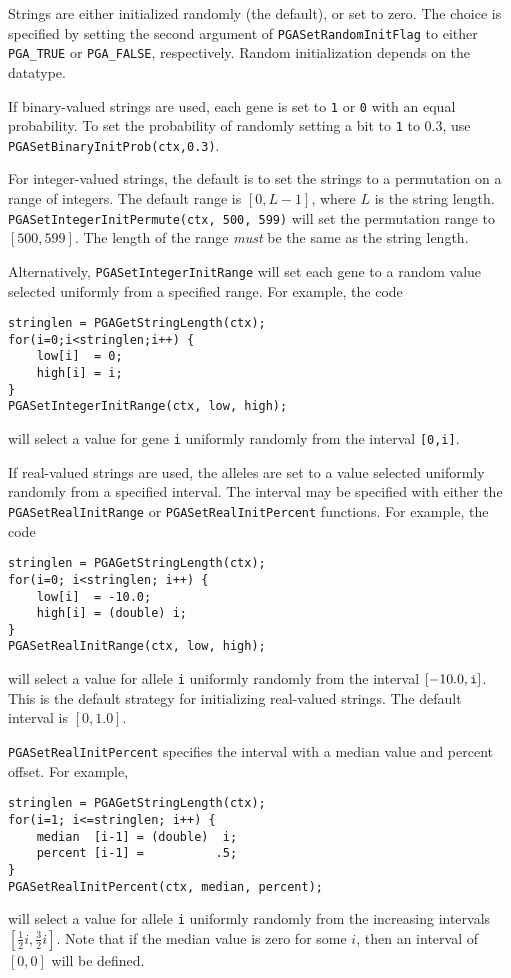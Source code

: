 \documentclass{report}
\begin{document}
Strings are either initialized randomly (the default),
or set to zero.  The choice is specified by setting the second argument of
{\tt PGASetRandomInitFlag} to either {\tt PGA\_TRUE} or {\tt PGA\_FALSE},
respectively.  Random initialization depends on the datatype.

If binary-valued strings are used, each gene is set to {\tt 1} or {\tt 0} with
an equal probability.  To set the probability of randomly setting a bit to
{\tt 1} to 0.3, use {\tt PGASetBinaryInitProb(ctx,0.3)}.

For integer-valued strings, the default is to set the strings to a permutation
on a range of integers.  The default range is $[0,L-1]$, where $L$ is the
string length.  {\tt PGASetIntegerInitPermute(ctx, 500, 599)} will set the
permutation range to $[500,599]$.  The length of the range {\em must} be the
same as the string length.

Alternatively, {\tt PGASetIntegerInitRange} will set each gene to a random value
selected uniformly from a specified range.  For example, the code
\begin{verbatim}
stringlen = PGAGetStringLength(ctx);
for(i=0;i<stringlen;i++) {
    low[i]  = 0;
    high[i] = i;
}
PGASetIntegerInitRange(ctx, low, high);
\end{verbatim}
will select a value for gene {\tt i} uniformly randomly from the interval
{\tt [0,i]}.

If real-valued strings are used, the alleles are set to a value selected
uniformly randomly from a specified interval.  The interval may be specified
with either the {\tt PGASetRealInitRange} or {\tt PGASetRealInitPercent}
functions.
For example, the code
\begin{verbatim}
stringlen = PGAGetStringLength(ctx);
for(i=0; i<stringlen; i++) {
    low[i]  = -10.0;
    high[i] = (double) i;
}
PGASetRealInitRange(ctx, low, high);
\end{verbatim}
will select a value for allele {\tt i} uniformly randomly from the interval
$[-10.0,{\tt i}]$.  This is the default strategy for initializing real-valued
strings.  The default interval is $[0,1.0]$.

{\tt PGASetRealInitPercent} specifies the interval with a median value and
percent offset.  For example,
\begin{verbatim}
stringlen = PGAGetStringLength(ctx);
for(i=1; i<=stringlen; i++) {
    median  [i-1] = (double)  i;
    percent [i-1] =          .5;
}
PGASetRealInitPercent(ctx, median, percent);
\end{verbatim}
will select a value for allele {\tt i} uniformly randomly from the increasing
intervals $[\frac{1}{2}i,\frac{3}{2}i]$.  Note that if
the median value is zero for some $i$, then an
interval of $[0,0]$ will be defined.
\end{document}
